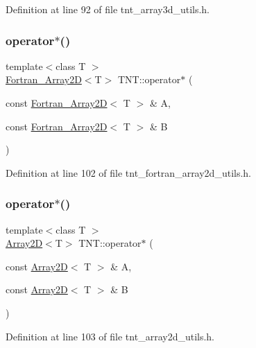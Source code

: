 Definition at line 92 of file tnt\+\_\+array3d\+\_\+utils.\+h.

\mbox{\label{namespaceTNT_a8a02ca89f6e9ca34b3061f20d4d36458}} 
\subsubsection{\texorpdfstring{operator$\ast$()}{operator*()}\hspace{0.1cm}{\footnotesize\ttfamily [3/8]}}
{\footnotesize\ttfamily template$<$class T $>$ \\
\hyperlink{classTNT_1_1Fortran__Array2D}{Fortran\+\_\+\+Array2D}$<$T$>$ T\+N\+T\+::operator$\ast$ (\begin{DoxyParamCaption}\item[{const \hyperlink{classTNT_1_1Fortran__Array2D}{Fortran\+\_\+\+Array2D}$<$ T $>$ \&}]{A,  }\item[{const \hyperlink{classTNT_1_1Fortran__Array2D}{Fortran\+\_\+\+Array2D}$<$ T $>$ \&}]{B }\end{DoxyParamCaption})}



Definition at line 102 of file tnt\+\_\+fortran\+\_\+array2d\+\_\+utils.\+h.

\mbox{\label{namespaceTNT_a96071349bb182069d12392430b5113fe}} 
\subsubsection{\texorpdfstring{operator$\ast$()}{operator*()}\hspace{0.1cm}{\footnotesize\ttfamily [4/8]}}
{\footnotesize\ttfamily template$<$class T $>$ \\
\hyperlink{classTNT_1_1Array2D}{Array2D}$<$T$>$ T\+N\+T\+::operator$\ast$ (\begin{DoxyParamCaption}\item[{const \hyperlink{classTNT_1_1Array2D}{Array2D}$<$ T $>$ \&}]{A,  }\item[{const \hyperlink{classTNT_1_1Array2D}{Array2D}$<$ T $>$ \&}]{B }\end{DoxyParamCaption})}



Definition at line 103 of file tnt\+\_\+array2d\+\_\+utils.\+h.


